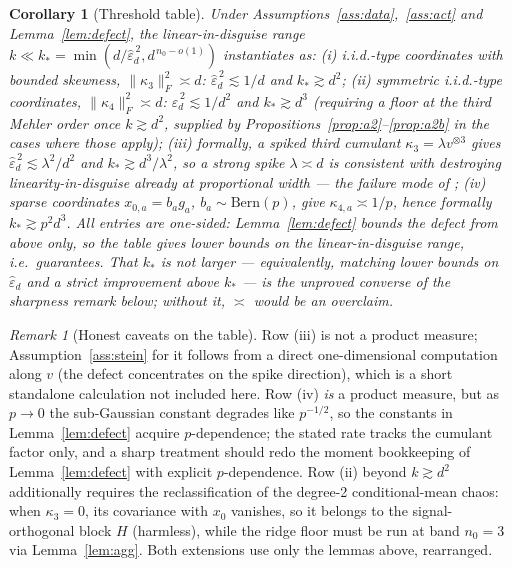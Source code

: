 \documentclass[11pt]{article}
\newtheorem{corollary}{Corollary}
\theoremstyle{remark}
\newtheorem{remark}{Remark}
\newcommand{\Fro}[1]{\lVert #1 \rVert_F}
\begin{document}
\begin{corollary}[Threshold table]\label{cor:table}
Under Assumptions~\ref{ass:data},~\ref{ass:act} and Lemma~\ref{lem:defect}, the linear-in-disguise range $k \ll k_* = \min(d/\hat\varepsilon_d^{\,2}, d^{\,n_0-o(1)})$ instantiates as: (i) i.i.d.-type coordinates with bounded skewness, $\Fro{\kappa_3}^2 \asymp d$: $\hat\varepsilon_d^{\,2} \lesssim 1/d$ and $k_* \gtrsim d^2$; (ii) symmetric i.i.d.-type coordinates, $\Fro{\kappa_4}^2 \asymp d$: $\hat\varepsilon_d^{\,2} \lesssim 1/d^2$ and $k_* \gtrsim d^{3}$ (requiring a floor at the third Mehler order once $k \gtrsim d^2$, supplied by Propositions~\ref{prop:a2}--\ref{prop:a2b} in the cases where those apply); (iii) formally, a spiked third cumulant $\kappa_3 = \lambda v^{\otimes 3}$ gives $\hat\varepsilon_d^{\,2} \lesssim \lambda^2/d^2$ and $k_* \gtrsim d^3/\lambda^2$, so a strong spike $\lambda \asymp d$ is \emph{consistent with} destroying linearity-in-disguise already at proportional width --- the failure mode of \cite{Pesce23}; (iv) sparse coordinates $x_{0,a} = b_a g_a$, $b_a \sim \mathrm{Bern}(p)$, give $\kappa_{4,a} \asymp 1/p$, hence formally $k_* \gtrsim p^2 d^3$. All entries are \emph{one-sided}: Lemma~\ref{lem:defect} bounds the defect from above only, so the table gives lower bounds on the linear-in-disguise range, i.e.\ guarantees. That $k_*$ is not larger --- equivalently, matching lower bounds on $\hat\varepsilon_d$ and a strict improvement above $k_*$ --- is the unproved converse of the sharpness remark below; without it, $\asymp$ would be an overclaim.
\end{corollary}

\begin{remark}[Honest caveats on the table]
Row (iii) is not a product measure; Assumption~\ref{ass:stein} for it follows from a direct one-dimensional computation along $v$ (the defect concentrates on the spike direction), which is a short standalone calculation not included here. Row (iv) \emph{is} a product measure, but as $p \to 0$ the sub-Gaussian constant degrades like $p^{-1/2}$, so the constants in Lemma~\ref{lem:defect} acquire $p$-dependence; the stated rate tracks the cumulant factor only, and a sharp treatment should redo the moment bookkeeping of Lemma~\ref{lem:defect} with explicit $p$-dependence. Row (ii) beyond $k \gtrsim d^2$ additionally requires the reclassification of the degree-2 conditional-mean chaos: when $\kappa_3 = 0$, its covariance with $x_0$ vanishes, so it belongs to the signal-orthogonal block $H$ (harmless), while the ridge floor must be run at band $n_0 = 3$ via Lemma~\ref{lem:agg}. Both extensions use only the lemmas above, rearranged.
\end{remark}
\end{document}
